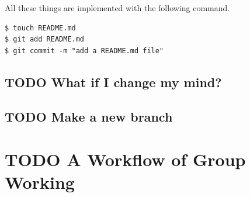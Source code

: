 \documentclass[a4paper,11pt]{article}
\begin{document}
All these things are implemented with the following command.
\begin{verbatim}
$ touch README.md
$ git add README.md
$ git commit -m "add a README.md file"
\end{verbatim}


\subsection{{\bfseries\sffamily TODO} What if I change my mind?}
\label{sec:org50824d4}



\subsection{{\bfseries\sffamily TODO} Make a new branch}
\label{sec:org22d3bb1}



\section{{\bfseries\sffamily TODO} A Workflow of Group Working}
\label{sec:orgc5355a5}
\end{document}
